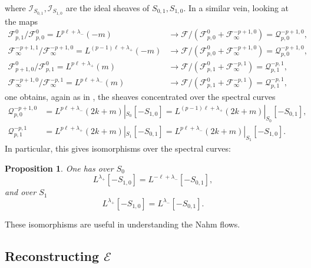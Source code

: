 \documentclass[12pt]{article}
\newtheorem{proposition}[theorem]{Proposition}
\theoremstyle{definition}
\theoremstyle{remark}
\numberwithin{theorem}{section}
\def\pE{{\mathcal E}}
\def\pF{{\mathcal F}}
\def\pI{{\mathcal I}}
\def\pQ{{\mathcal Q}}
\begin{document}
where $ \pI_{S_{0,1}},  \pI_{S_{1,0}}$ are the ideal sheaves of $S_{0,1}, S_{1,0}$. In a similar vein, looking at the maps
\begin{align*} %
\pF^0_{ p,1}/ \pF^0_{ p,0} =  L^{p\ell + \lambda_-}(-m)& \rightarrow  \pF/(\pF^0_{p,0}+\pF_\infty^{-p+1 ,0})=\pQ_{p,0}^{-p+1 ,0}, \\
 \pF_\infty^{-p+1,1}/\pF_\infty^{-p+1,0}= L^{(p-1)\ell + \lambda_+}(-m) & \rightarrow  \pF/(\pF^0_{p,0}+\pF_\infty^{-p+1 ,0})=\pQ_{p,0}^{-p+1 ,0}, \\
  \pF^0_{ p+1,0}/ \pF^0_{ p,1} =  L^{ p\ell +\lambda_+}(m)&\rightarrow \pF/(\pF^0_{p ,1}+\pF_\infty^{-p ,1})=\pQ_{p ,1}^{-p ,1}, \\
 \pF_\infty^{-p+1,0}/\pF_\infty^{-p,1}= L^{ p\ell+\lambda_-}( m)&\rightarrow\pF/(\pF^0_{p ,1}+\pF_\infty^{-p ,1}) =\pQ_{p ,1}^{-p ,1},  
\end{align*}
one obtains, again as in \cite{Garland-Murray}, the sheaves concentrated over the spectral curves
 \begin{align}\label{Qs} \pQ_{p,0}^{-p+1 ,0}  &= L^{p\ell + \lambda_-}(2k+m)|_{S_0}[-S_{1,0}] =  L^{ (p-1)\ell +\lambda_+}(2k+m)|_{S_0}[-S_{0,1}],\\
\pQ_{p ,1}^{-p ,1}&=   L^{ p\ell + \lambda_+}(2k+m)|_{S_1}[-S_{0,1}] 
 =  L^{p\ell +\lambda_-}(2k+m)|_{S_1}[-S_{1,0}].
 \end{align}
 In particular, this gives isomorphisms over the spectral curves: 
 
 \begin{proposition}
 One has over $S_0$
 $$L^{ \lambda_+}  [-S_{1,0}] =  L^{ -\ell +\lambda_-} [-S_{0,1}],$$ 
 and over $S_1$
 $$L^{  \lambda_+}  [-S_{1,0}]  =  L^{ \lambda_-} [-S_{0,1}].$$
 \end{proposition}
 
 These isomorphisms are useful in understanding the Nahm flows.

\subsection{Reconstructing $\pE$}
\end{document}
